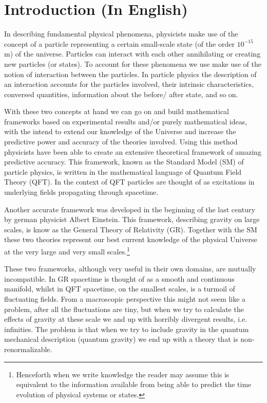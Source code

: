 \section{Introduction (In English)}
In describing fundamental physical phenomena, physicists make use of the concept of a particle representing a certain small-scale state (of the order $10^{-15}$ m) of the universe. Particles can interact with each other annihilating or creating new particles (or states). To account for these phenomena we use make use of the notion of interaction between the particles. In particle physics the description of an interaction accounts for the particles involved, their intrinsic characteristics, conversed quantities, information about the before/ after state, and so on.

With these two concepts at hand we can go on and build mathematical frameworks based on experimental results and/or purely mathematical ideas, with the intend to extend our knowledge of the Universe and increase the predictive power and accuracy of the theories involved. Using this method physicists have been able to create an extensive theoretical framework of amazing predictive accuracy. This framework, known as the Standard Model (SM) of particle physics, is written in the mathematical language of Quantum Field Theory (QFT). In the context of QFT particles are thought of as excitations in underlying fields propagating through spacetime.

Another accurate framework was developed in the beginning of the last century by german physicist Albert Einstein. This framework, describing gravity on large scales, is know as the General Theory of Relativity (GR). Together with the SM these two theories represent our best current knowledge of the physical Universe at the very large and very small scales.\footnote{Henceforth when we write knowledge the reader may assume this is equivalent to the information available from being able to predict the time evolution of physical systems or states.}

These two frameworks, although very useful in their own domains, are mutually incompatible. In GR spacetime is thought of as a smooth and continuous manifold, whilst in QFT spacetime, on the smallest scales, is a turmoil of fluctuating fields. From a macroscopic perspective this might not seem like a problem, after all the fluctuations are tiny, but when we try to calculate the effects of gravity at these scale we and up with horribly divergent results, i.e. infinities. The problem is that when we try to include gravity in the quantum mechanical description (quantum gravity) we end up with a theory that is non-renormalizable.

